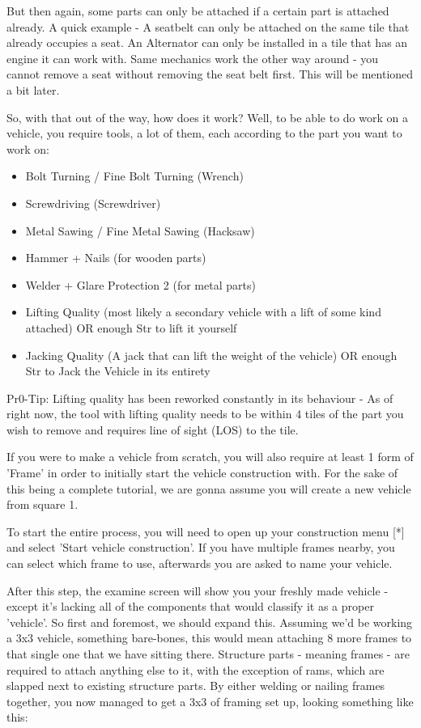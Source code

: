 But then again, some parts can only be attached if a certain part is attached already. A quick example - A seatbelt can only be attached on the same tile that already occupies a seat. An Alternator can only be installed in a tile that has an engine it can work with. Same mechanics work the other way around - you cannot remove a seat without removing the seat belt first. This will be mentioned a bit later.

So, with that out of the way, how does it work? Well, to be able to do work on a vehicle, you require tools, a lot of them, each according to the part you want to work on:

\begin{itemize}
\item Bolt Turning / Fine Bolt Turning (Wrench)
\item Screwdriving (Screwdriver)
\item Metal Sawing / Fine Metal Sawing (Hacksaw)
\item Hammer + Nails (for wooden parts)
\item Welder + Glare Protection 2 (for metal parts)
\item Lifting Quality (most likely a secondary vehicle with a lift of some kind attached) OR enough Str to lift it yourself
\item Jacking Quality (A jack that can lift the weight of the vehicle) OR enough Str to Jack the Vehicle in its entirety
\end{itemize}

Pr0-Tip: Lifting quality has been reworked constantly in its behaviour - As of right now, the tool with lifting quality needs to be within 4 tiles of the part you wish to remove and requires line of sight (LOS) to the tile.

If you were to make a vehicle from scratch, you will also require at least 1 form of 'Frame' in order to initially start the vehicle construction with. For the sake of this being a complete tutorial, we are gonna assume you will create a new vehicle from square 1.

To start the entire process, you will need to open up your construction menu [*] and select 'Start vehicle construction'. If you have multiple frames nearby, you can select which frame to use, afterwards you are asked to name your vehicle.

After this step, the examine screen will show you your freshly made vehicle - except it's lacking all of the components that would classify it as a proper 'vehicle'. So first and foremost, we should expand this. Assuming we'd be working a 3x3 vehicle, something bare-bones, this would mean attaching 8 more frames to that single one that we have sitting there. Structure parts - meaning frames - are required to attach anything else to it, with the exception of rams, which are slapped next to existing structure parts. By either welding or nailing frames together, you now managed to get a 3x3 of framing set up, looking something like this:


